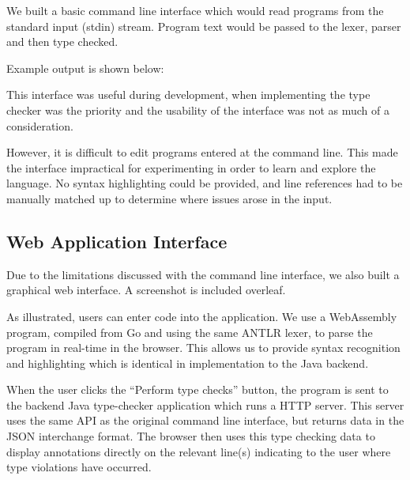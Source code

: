 \documentclass[a4paper,openany,12pt]{book}
\begin{document}
We built a basic command line interface which would read programs from the standard input (stdin) stream.
Program text would be passed to the lexer, parser and then type checked.

Example output is shown below:


This interface was useful during development, when implementing the type checker was the priority and the usability
of the interface was not as much of a consideration.

However, it is difficult to edit programs entered at the command line.
This made the interface impractical for experimenting in order to learn and explore the language.
No syntax highlighting could be provided, and line references had to be manually matched up to determine where
issues arose in the input.

\subsection{Web Application Interface}

Due to the limitations discussed with the command line interface, we also built a graphical web interface.
A screenshot is included overleaf.

As illustrated, users can enter code into the application.
We use a WebAssembly program, compiled from Go and using the same ANTLR lexer, to parse the program in real-time in
the browser.
This allows us to provide syntax recognition and highlighting which is identical in implementation to the Java backend.

When the user clicks the ``Perform type checks'' button, the program is sent to the backend Java type-checker application
which runs a HTTP server.
This server uses the same API as the original command line interface, but returns data in the JSON interchange format.
The browser then uses this type checking data to display annotations directly on the relevant line(s) indicating to the
user where type violations have occurred.
\end{document}
